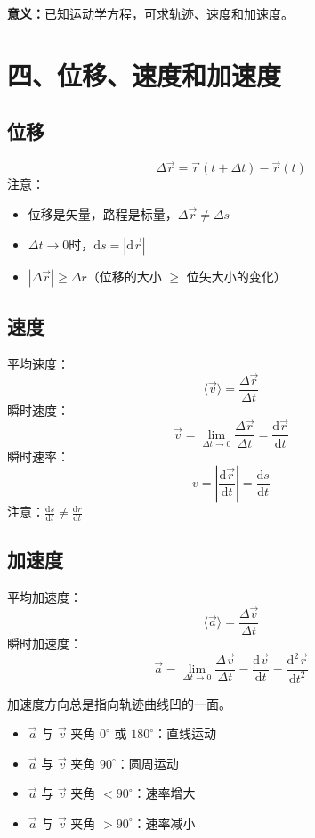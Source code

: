 \documentclass{ctexart}
\begin{document}
\textbf{意义：}已知运动学方程，可求轨迹、速度和加速度。

\section*{四、位移、速度和加速度}

\subsection*{位移}
\[
\Delta\vec{r} = \vec{r}(t+\Delta t) - \vec{r}(t)
\]
注意：
\begin{itemize}
  \item 位移是矢量，路程是标量，$\Delta\vec{r} \neq \Delta s$
  \item $\Delta t \to 0$时，$\mathrm{d}s = |\mathrm{d}\vec{r}|$
  \item $|\Delta\vec{r}| \geq \Delta r$（位移的大小 $\geq$ 位矢大小的变化）
\end{itemize}

\subsection*{速度}
平均速度：
\[
\langle\vec{v}\rangle = \frac{\Delta\vec{r}}{\Delta t}
\]
瞬时速度：
\[
\vec{v} = \lim_{\Delta t\to 0}\frac{\Delta\vec{r}}{\Delta t} = \frac{\mathrm{d}\vec{r}}{\mathrm{d}t}
\]
瞬时速率：
\[
v = \left|\frac{\mathrm{d}\vec{r}}{\mathrm{d}t}\right| = \frac{\mathrm{d}s}{\mathrm{d}t}
\]
注意：$\displaystyle\frac{\mathrm{d}s}{\mathrm{d}t} \neq \frac{\mathrm{d}r}{\mathrm{d}t}$

\subsection*{加速度}
平均加速度：
\[
\langle\vec{a}\rangle = \frac{\Delta\vec{v}}{\Delta t}
\]
瞬时加速度：
\[
\vec{a} = \lim_{\Delta t\to 0}\frac{\Delta\vec{v}}{\Delta t} = \frac{\mathrm{d}\vec{v}}{\mathrm{d}t} = \frac{\mathrm{d}^{2}\vec{r}}{\mathrm{d}t^{2}}
\]

加速度方向总是指向轨迹曲线凹的一面。
\begin{itemize}
  \item $\vec{a}$ 与 $\vec{v}$ 夹角 $0^\circ$ 或 $180^\circ$：直线运动
  \item $\vec{a}$ 与 $\vec{v}$ 夹角 $90^\circ$：圆周运动
  \item $\vec{a}$ 与 $\vec{v}$ 夹角 $<90^\circ$：速率增大
  \item $\vec{a}$ 与 $\vec{v}$ 夹角 $>90^\circ$：速率减小
\end{itemize}
\end{document}
